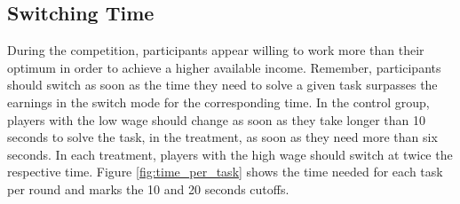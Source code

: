 \begin{table}[!htbp] \centering 
  \caption{Linear Mixed Model - Net Income} 
  \label{table:earnings_lmer}
\end{table} 


\subsection{Switching Time}
During the competition, participants appear willing to work more than their optimum in order to achieve a higher available income. Remember, participants should switch as soon as the time they need to solve a given task surpasses the earnings in the switch mode for the corresponding time. In the control group, players with the low wage should change as soon as they take longer than 10 seconds to solve the task, in the treatment, as soon as they need more than six seconds. In each treatment, players with the high wage should switch at twice the respective time. Figure \ref{fig:time_per_task} shows the time needed for each task per round and marks the 10 and 20 seconds cutoffs.\\

